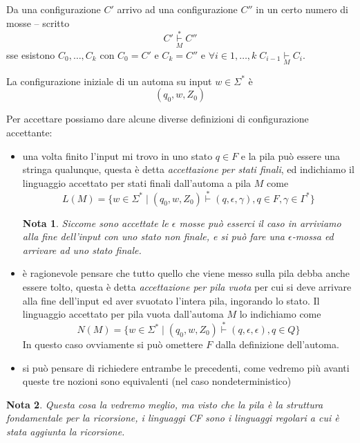 \documentclass[12pt]{report}
\newtheorem{nota}{Nota}
\begin{document}
Da una configurazione $C'$ arrivo ad una configurazione $C''$ in un certo numero di mosse -- scritto 
$$ C' \underset{M}{\overset{*}{\vdash}} C'' $$
sse esistono $C_0, \dots, C_k$ con $C_0 = C'$ e $C_k = C''$ e $\forall i \in 1, \dots, k \; C_{i - 1} \underset{M}{\vdash} C_i$.

La configurazione iniziale di un automa su input $w \in \Sigma^*$ è 
$$ (q_0, w, Z_0) $$

Per accettare possiamo dare alcune diverse definizioni di configurazione accettante:
\begin{itemize}
	\item una volta finito l'input mi trovo in uno stato $q \in F$ e la pila può essere una stringa qualunque, questa è detta \textit{accettazione per stati finali}, ed indichiamo il linguaggio accettato per stati finali dall'automa a pila $M$ come
		$$ L(M) = \{ w \in \Sigma^* \mid (q_0, w, Z_0) \overset{*}{\vdash} (q, \epsilon, \gamma), q \in F, \gamma \in \Gamma^* \} $$
		\begin{nota}
			Siccome sono accettate le $\epsilon$ mosse può esserci il caso in arriviamo alla fine dell'input con uno stato non finale, e si può fare una $\epsilon$-mossa ed arrivare ad uno stato finale.
		\end{nota}
	\item è ragionevole pensare che tutto quello che viene messo sulla pila debba anche essere tolto, questa è detta \textit{accettazione per pila vuota} per cui si deve arrivare alla fine dell'input ed aver svuotato l'intera pila, ingorando lo stato.
		Il linguaggio accettato per pila vuota dall'automa $M$ lo indichiamo come
		$$ N(M) = \{ w \in \Sigma^* \mid (q_0, w, Z_0) \overset{*}{\vdash} (q, \epsilon, \epsilon), q \in Q \} $$
		In questo caso ovviamente si può omettere $F$ dalla definizione dell'automa.
	\item si può pensare di richiedere entrambe le precedenti, come vedremo più avanti queste tre nozioni sono equivalenti (nel caso nondeterministico)
\end{itemize}
\begin{nota}
	Questa cosa la vedremo meglio, ma visto che la pila è la struttura fondamentale per la ricorsione, i linguaggi CF sono i linguaggi regolari a cui è stata aggiunta la ricorsione.
\end{nota}
\end{document}
